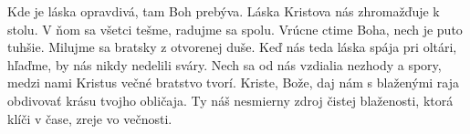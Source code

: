 Kde je láska opravdivá, 
tam Boh prebýva.
\versseparator
Láska Kristova nás zhromažďuje k stolu. 
V ňom sa všetci tešme, radujme sa spolu.
Vrúcne ctime Boha, nech je puto tuhšie. 
Milujme sa bratsky z otvorenej duše.
\versseparator
Keď nás teda láska spája pri oltári, 
hľaďme, by nás nikdy nedelili sváry. 
Nech sa od nás vzdialia nezhody a spory,
medzi nami Kristus večné bratstvo tvorí.
\versseparator
Kriste, Bože, daj nám s blaženými raja 
obdivovať krásu tvojho obličaja.
Ty náš nesmierny zdroj 
čistej blaženosti, 
ktorá klíči v čase, zreje vo večnosti.